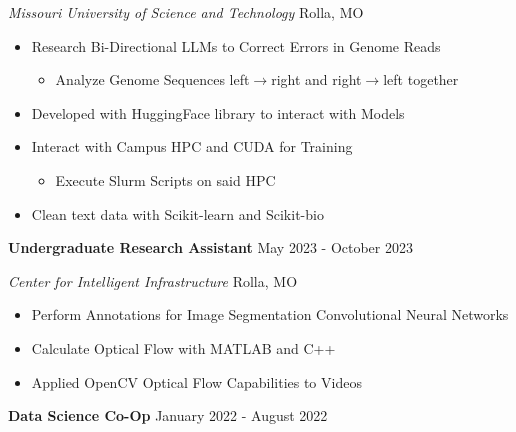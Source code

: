 \documentclass[11pt]{article}
\begin{document}
\textsl{Missouri University of Science and Technology} \hfill Rolla, MO
\begin{itemize}[noitemsep, topsep=0pt, partopsep=0pt, parsep=0pt, itemsep=0pt]
    \item Research Bi-Directional LLMs to Correct Errors in Genome Reads
    \begin{itemize}[noitemsep, topsep=0pt, partopsep=0pt, parsep=0pt, itemsep=0pt]
        \item Analyze Genome Sequences left$\rightarrow$right and right$\rightarrow$left together
    \end{itemize}
    \item Developed with HuggingFace library to interact with Models
    \item Interact with Campus HPC and CUDA for Training
    \begin{itemize}[noitemsep, topsep=0pt, partopsep=0pt, parsep=0pt, itemsep=0pt]
        \item Execute Slurm Scripts on said HPC
    \end{itemize}
    \item Clean text data with Scikit-learn and Scikit-bio
\end{itemize}


\textbf{Undergraduate Research Assistant} \hfill May 2023 - October 2023

\textsl{Center for Intelligent Infrastructure} \hfill Rolla, MO
\begin{itemize}[noitemsep, topsep=0pt, partopsep=0pt, parsep=0pt, itemsep=0pt]
    \item Perform Annotations for Image Segmentation Convolutional Neural Networks
    \item Calculate Optical Flow with MATLAB and C++
    \item Applied OpenCV Optical Flow Capabilities to Videos
\end{itemize}


\textbf{Data Science Co-Op} \hfill January 2022 - August 2022
\end{document}
